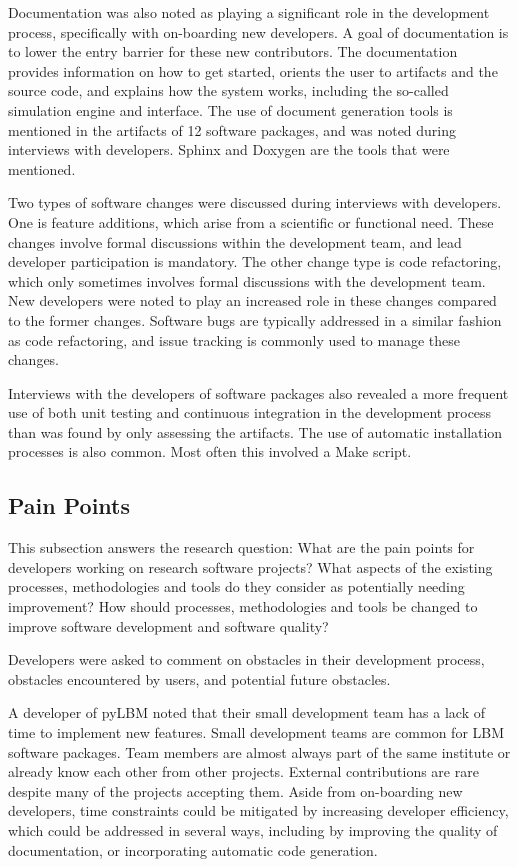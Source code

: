 \documentclass[12pt, notitlepage]{article}
\begin{document}
Documentation was also noted as playing a significant role in the development process, specifically with on-boarding new developers. A goal of documentation is to lower the entry barrier for these new contributors. The documentation provides information on how to get started, orients the user to artifacts and the source code, and explains how the system works, including the so-called simulation engine and interface. The use of document generation tools is mentioned in the artifacts of 12 software packages, and was noted during interviews with developers. Sphinx and Doxygen are the tools that were mentioned. 

Two types of software changes were discussed during interviews with developers. One is feature additions, which arise from a scientific or functional need. These changes involve formal discussions within the development team, and lead developer participation is mandatory. The other change type is code refactoring, which only sometimes involves formal discussions with the development team. New developers were noted to play an increased role in these changes compared to the former changes. Software bugs are typically addressed in a similar fashion as code refactoring, and issue tracking is commonly used to manage these changes. 

Interviews with the developers of software packages also revealed a more frequent use of both unit testing and continuous integration in the development process than was found by only assessing the artifacts. The use of automatic installation processes is also common. Most often this involved a Make script.


\subsection{Pain Points}\label{painpoints}

This subsection answers the research question: What are the pain points for developers working on research software projects? What aspects of the existing processes, methodologies and tools do they consider as potentially needing improvement? How should processes, methodologies and tools be changed to improve software development and software quality?

Developers were asked to comment on obstacles in their development process, obstacles encountered by users, and potential future obstacles. 

A developer of pyLBM noted that their small development team has a lack of time to implement new features. Small development teams are common for LBM software packages. Team members are almost always part of the same institute or already know each other from other projects. External contributions are rare despite many of the projects accepting them. Aside from on-boarding new developers, time constraints could be mitigated by increasing developer efficiency, which could be addressed in several ways, including by improving the quality of documentation, or incorporating automatic code generation.
\end{document}
